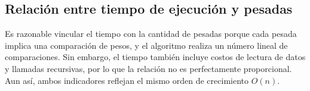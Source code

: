 \subsection{Relación entre tiempo de ejecución y pesadas}

Es razonable vincular el tiempo con la cantidad de pesadas porque cada pesada implica una comparación de pesos, y el algoritmo realiza un número lineal de comparaciones. Sin embargo, el tiempo también incluye costos de lectura de datos y llamadas recursivas, por lo que la relación no es perfectamente proporcional. Aun así, ambos indicadores reflejan el mismo orden de crecimiento $O(n)$.
